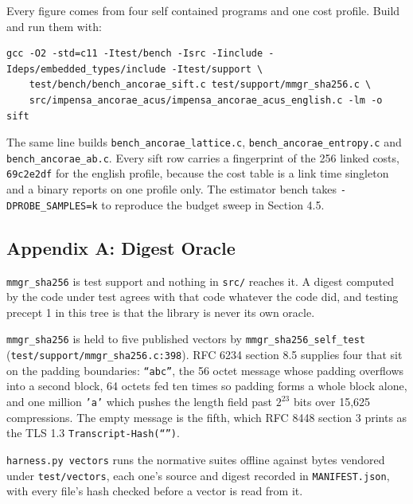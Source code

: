 Every figure comes from four self contained programs and one cost profile. Build and run them with:

\begin{lstlisting}[breaklines=true,breakatwhitespace=false,basicstyle=\ttfamily\small]
gcc -O2 -std=c11 -Itest/bench -Isrc -Iinclude -Ideps/embedded_types/include -Itest/support \
    test/bench/bench_ancorae_sift.c test/support/mmgr_sha256.c \
    src/impensa_ancorae_acus/impensa_ancorae_acus_english.c -lm -o sift
\end{lstlisting}

The same line builds \texttt{bench\_\allowbreak{}ancorae\_\allowbreak{}lattice.\allowbreak{}c}, \texttt{bench\_\allowbreak{}ancorae\_\allowbreak{}entropy.\allowbreak{}c} and \texttt{bench\_\allowbreak{}ancorae\_\allowbreak{}ab.\allowbreak{}c}. Every sift row carries a fingerprint of the 256 linked costs, \texttt{69c2e2df} for the english profile, because the cost table is a link time singleton and a binary reports on one profile only. The estimator bench takes \texttt{-\allowbreak{}DPROBE\_\allowbreak{}SAMPLES=k} to reproduce the budget sweep in Section 4.5.

\subsection{Appendix A: Digest Oracle}

\texttt{mmgr\_\allowbreak{}sha256} is test support and nothing in \texttt{src/\allowbreak{}} reaches it. A digest computed by the code under test agrees with that code whatever the code did, and testing precept 1 in this tree is that the library is never its own oracle.

\texttt{mmgr\_\allowbreak{}sha256} is held to five published vectors by \texttt{mmgr\_\allowbreak{}sha256\_\allowbreak{}self\_\allowbreak{}test} (\texttt{test/\allowbreak{}support/\allowbreak{}mmgr\_\allowbreak{}sha256.\allowbreak{}c:398}). RFC 6234 section 8.5 supplies four that sit on the padding boundaries: \texttt{``abc''}, the 56 octet message whose padding overflows into a second block, 64 octets fed ten times so padding forms a whole block alone, and one million \texttt{'a'} which pushes the length field past \(2^{23}\) bits over 15,625 compressions. The empty message is the fifth, which RFC 8448 section 3 prints as the TLS 1.3 \texttt{Transcript-\allowbreak{}Hash(``'')}.

\texttt{harness.\allowbreak{}py vectors} runs the normative suites offline against bytes vendored under \texttt{test/\allowbreak{}vectors}, each one's source and digest recorded in \texttt{MANIFEST.\allowbreak{}json}, with every file's hash checked before a vector is read from it.


